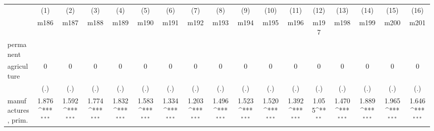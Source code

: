 {
\def\sym#1{\ifmmode^{#1}\else\(^{#1}\)\fi}
\begin{tabular}{l*{16}{c}}
\hline\hline
                    &\multicolumn{1}{c}{(1)}&\multicolumn{1}{c}{(2)}&\multicolumn{1}{c}{(3)}&\multicolumn{1}{c}{(4)}&\multicolumn{1}{c}{(5)}&\multicolumn{1}{c}{(6)}&\multicolumn{1}{c}{(7)}&\multicolumn{1}{c}{(8)}&\multicolumn{1}{c}{(9)}&\multicolumn{1}{c}{(10)}&\multicolumn{1}{c}{(11)}&\multicolumn{1}{c}{(12)}&\multicolumn{1}{c}{(13)}&\multicolumn{1}{c}{(14)}&\multicolumn{1}{c}{(15)}&\multicolumn{1}{c}{(16)}\\
                    &\multicolumn{1}{c}{m186}&\multicolumn{1}{c}{m187}&\multicolumn{1}{c}{m188}&\multicolumn{1}{c}{m189}&\multicolumn{1}{c}{m190}&\multicolumn{1}{c}{m191}&\multicolumn{1}{c}{m192}&\multicolumn{1}{c}{m193}&\multicolumn{1}{c}{m194}&\multicolumn{1}{c}{m195}&\multicolumn{1}{c}{m196}&\multicolumn{1}{c}{m197}&\multicolumn{1}{c}{m198}&\multicolumn{1}{c}{m199}&\multicolumn{1}{c}{m200}&\multicolumn{1}{c}{m201}\\
\hline
permanent           &                     &                     &                     &                     &                     &                     &                     &                     &                     &                     &                     &                     &                     &                     &                     &                     \\
agriculture         &           0         &           0         &           0         &           0         &           0         &           0         &           0         &           0         &           0         &           0         &           0         &           0         &           0         &           0         &           0         &           0         \\
                    &         (.)         &         (.)         &         (.)         &         (.)         &         (.)         &         (.)         &         (.)         &         (.)         &         (.)         &         (.)         &         (.)         &         (.)         &         (.)         &         (.)         &         (.)         &         (.)         \\
[1em]
manufactures, prim. &       1.876\sym{***}&       1.592\sym{***}&       1.774\sym{***}&       1.832\sym{***}&       1.583\sym{***}&       1.334\sym{***}&       1.203\sym{***}&       1.496\sym{***}&       1.523\sym{***}&       1.520\sym{***}&       1.392\sym{***}&       1.055\sym{**} &       1.470\sym{***}&       1.889\sym{***}&       1.965\sym{***}&       1.646\sym{***}\\

\end{tabular}}
